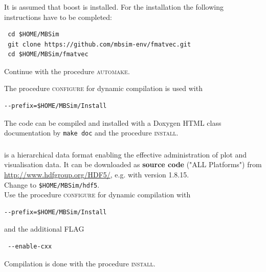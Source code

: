 \subsubsection{\FMatVec{}}
It is assumed that boost is installed. For the installation the following instructions have to be completed:
\begin{verbatim}
 cd $HOME/MBSim
 git clone https://github.com/mbsim-env/fmatvec.git
 cd $HOME/MBSim/fmatvec
\end{verbatim}
Continue with the procedure \textsc{automake}.\par
The procedure \textsc{configure} for dynamic compilation is used with
\begin{verbatim}
--prefix=$HOME/MBSim/Install
\end{verbatim}
The code can be compiled and installed with a Doxygen HTML class documentation by \texttt{make doc} and the procedure \textsc{install}.

\subsubsection{\HDFSerie}
%
\paragraph{\HDF}
\HDF{} is a hierarchical data format enabling the effective administration of plot and visualisation data. It can be downloaded as \textbf{source code} ("ALL Platforms") from \url{http://www.hdfgroup.org/HDF5/}, e.g. with version 1.8.15.\\
%
Change to \texttt{\$HOME/MBSim/hdf5}.\\
%
Use the procedure \textsc{configure} for dynamic compilation with
\begin{verbatim}
--prefix=$HOME/MBSim/Install
\end{verbatim}
and the additional FLAG
\begin{verbatim}
 --enable-cxx
\end{verbatim}
Compilation is done with the procedure \textsc{install}.
%
